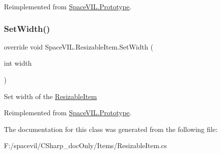 Reimplemented from \mbox{\hyperlink{class_space_v_i_l_1_1_prototype_adc0adcbd1c3800d9525798ba7be5832a}{Space\+V\+I\+L.\+Prototype}}.

\mbox{\label{class_space_v_i_l_1_1_resizable_item_a7f12553e7547d5ef653be8719e9cfee4}} 
\subsubsection{\texorpdfstring{Set\+Width()}{SetWidth()}}
{\footnotesize\ttfamily override void Space\+V\+I\+L.\+Resizable\+Item.\+Set\+Width (\begin{DoxyParamCaption}\item[{int}]{width }\end{DoxyParamCaption})\hspace{0.3cm}{\ttfamily [virtual]}}



Set width of the \mbox{\hyperlink{class_space_v_i_l_1_1_resizable_item}{Resizable\+Item}} 



Reimplemented from \mbox{\hyperlink{class_space_v_i_l_1_1_prototype_a6a4f1b9581f4d18f1c3a3e287d4b2a2b}{Space\+V\+I\+L.\+Prototype}}.



The documentation for this class was generated from the following file\+:\begin{DoxyCompactItemize}
\item 
F\+:/spacevil/\+C\+Sharp\+\_\+doc\+Only/\+Items/Resizable\+Item.\+cs\end{DoxyCompactItemize}
